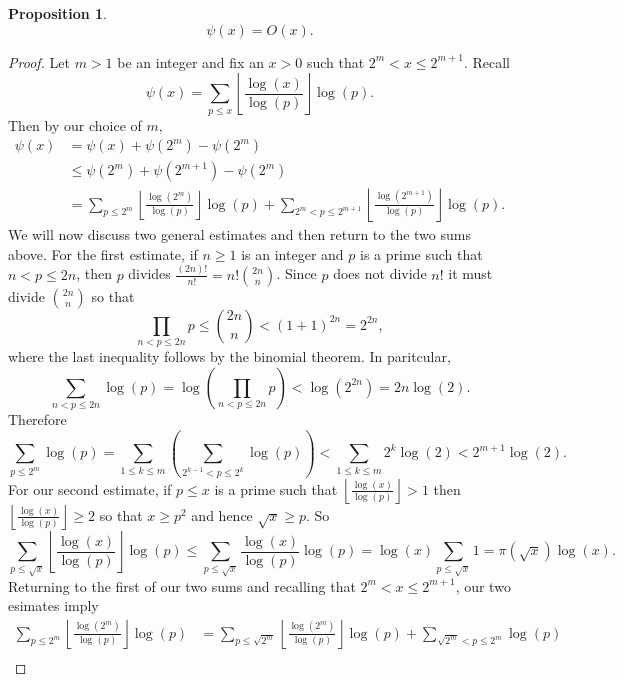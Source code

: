 \documentclass[12pt]{book}
\newtheorem{proposition}{Proposition}[section]
\theoremstyle{definition}\newframedtheorem{method}{Method}
\newcommand{\<}{\langle}
\renewcommand{\>}{\rangle}
\begin{document}
      \begin{proposition}\label{prop:second_Tchebychef_is_big_Oh_of_x}
        \phantom{ }
        \[
          \psi(x) = O(x).
        \]
      \end{proposition}
      \begin{proof}
        Let $m > 1$ be an integer and fix an $x > 0$ such that $2^{m} < x \le 2^{m+1}$. Recall
        \[
          \psi(x) = \sum_{p \le x}\left\lfloor\frac{\log(x)}{\log(p)}\right\rfloor\log(p).
        \]
        Then by our choice of $m$,
        \begin{align*}
          \psi(x) &= \psi(x)+\psi(2^{m})-\psi(2^{m}) \\
          &\le \psi(2^{m})+\psi(2^{m+1})-\psi(2^{m}) \\
          &= \sum_{p \le 2^{m}}\left\lfloor\frac{\log(2^{m})}{\log(p)}\right\rfloor\log(p)+\sum_{2^{m} < p \le 2^{m+1}}\left\lfloor\frac{\log(2^{m+1})}{\log(p)}\right\rfloor\log(p).
        \end{align*}
        We will now discuss two general estimates and then return to the two sums above. For the first estimate, if $n \ge 1$ is an integer and $p$ is a prime such that $n < p \le 2n$, then $p$ divides $\frac{(2n)!}{n!} = n!\binom{2n}{n}$. Since $p$ does not divide $n!$ it must divide $\binom{2n}{n}$ so that
        \[
          \prod_{n < p \le 2n}p \le \binom{2n}{n} < (1+1)^{2n} = 2^{2n},
        \]
        where the last inequality follows by the binomial theorem. In paritcular,
        \[
          \sum_{n < p \le 2n}\log(p) = \log\left(\prod_{n < p \le 2n}p\right) < \log(2^{2n}) = 2n\log(2).
        \]
        Therefore
        \[
          \sum_{p \le 2^{m}}\log(p) = \sum_{1 \le k \le m}\left(\sum_{2^{k-1} < p \le 2^{k}}\log(p)\right) < \sum_{1 \le k \le m}2^{k}\log(2) < 2^{m+1}\log(2).
        \]
        For our second estimate, if $p \le x$ is a prime such that $\left\lfloor\frac{\log(x)}{\log(p)}\right\rfloor > 1$ then $\left\lfloor\frac{\log(x)}{\log(p)}\right\rfloor \ge 2$ so that $x \ge p^{2}$ and hence $\sqrt{x} \ge p$. So
        \[
          \sum_{p \le \sqrt{x}}\left\lfloor\frac{\log(x)}{\log(p)}\right\rfloor\log(p) \le \sum_{p \le \sqrt{x}}\frac{\log(x)}{\log(p)}\log(p) = \log(x)\sum_{p \le \sqrt{x}}1 = \pi(\sqrt{x})\log(x).
        \]
        Returning to the first of our two sums and recalling that $2^{m} < x \le 2^{m+1}$, our two esimates imply
        \begin{align*}
          \sum_{p \le 2^{m}}\left\lfloor\frac{\log(2^{m})}{\log(p)}\right\rfloor\log(p) &= \sum_{p \le \sqrt{2^{m}}}\left\lfloor\frac{\log(2^{m})}{\log(p)}\right\rfloor\log(p)+\sum_{\sqrt{2^{m}} < p \le 2^{m}}\log(p) \\

\end{align*}
\end{proof}
\end{document}
